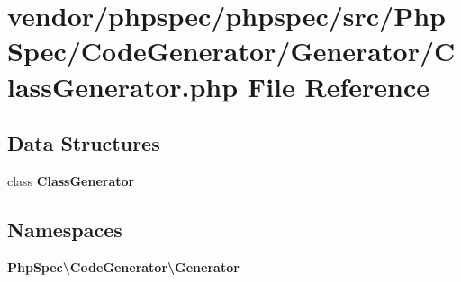\section{vendor/phpspec/phpspec/src/\+Php\+Spec/\+Code\+Generator/\+Generator/\+Class\+Generator.php File Reference}
\label{_class_generator_8php}
\subsection*{Data Structures}
\begin{DoxyCompactItemize}
\item 
class {\bf Class\+Generator}
\end{DoxyCompactItemize}
\subsection*{Namespaces}
\begin{DoxyCompactItemize}
\item 
 {\bf Php\+Spec\textbackslash{}\+Code\+Generator\textbackslash{}\+Generator}
\end{DoxyCompactItemize}
